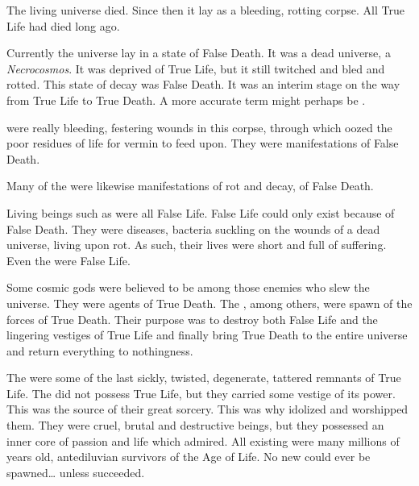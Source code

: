 The living universe died. 
Since then it lay as a bleeding, rotting corpse. 
All True Life had died long ago. 


Currently the universe lay in a state of False Death. 
It was a dead universe, a \emph{Necrocosmos}.
It was deprived of True Life, but it still twitched and bled and rotted. 
This state of decay was False Death. 
It was an interim stage on the way from True Life to True Death. 
A more accurate term might perhaps be . 

\Dweomers were really bleeding, festering wounds in this corpse, through which oozed the poor residues of life for vermin to feed upon. 
They were manifestations of False Death. 

Many of the  were likewise manifestations of rot and decay, of False Death. 

Living beings such as \Miithians were all False Life. 
False Life could only exist because of False Death. 
They were diseases, bacteria suckling on the wounds of a dead universe, living upon rot. 
As such, their lives were short and full of suffering. 
Even the \voyagers were False Life. 

Some cosmic gods were believed to be among those enemies who slew the universe. 
They were agents of True Death. 
The \banes, among others, were spawn of the forces of True Death.
Their purpose was to destroy both False Life and the lingering vestiges of True Life and finally bring True Death to the entire universe and return everything to nothingness. 

The \xss were some of the last sickly, twisted, degenerate, tattered remnants of True Life. 
The \xss did not possess True Life, but they carried some vestige of its power.
This was the source of their great sorcery. 
This was why \Sethicus idolized and worshipped them. 
They were cruel, brutal and destructive beings, but they possessed an inner core of passion and life which \Sethicus admired. 
All existing \xss were many millions of years old, antediluvian survivors of the Age of Life. 
No new \xss could ever be spawned\ldots{} unless  succeeded.

